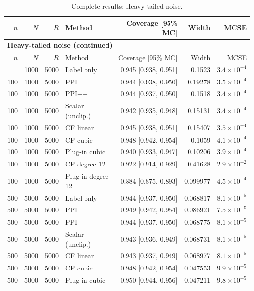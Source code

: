 {\setlength{\tabcolsep}{3pt}\begin{longtable}{rrrlrrr}
\caption{Complete results: Heavy-tailed noise.}\\
\toprule $n$ & $N$ & $R$ & Method & Coverage [95\% MC] & Width & MCSE \\
\midrule\endfirsthead
\multicolumn{7}{l}{\textbf{Heavy-tailed noise (continued)}}\\
\toprule $n$ & $N$ & $R$ & Method & Coverage [95\% MC] & Width & MCSE \\
\midrule\endhead
\bottomrule\endfoot
100 & 1000 & 5000 & Label only & 0.945 [0.938, 0.951] & 0.1523 & $3.4\times 10^{-4}$ \\
100 & 1000 & 5000 & PPI & 0.944 [0.938, 0.950] & 0.19278 & $3.5\times 10^{-4}$ \\
100 & 1000 & 5000 & PPI++ & 0.944 [0.937, 0.950] & 0.1518 & $3.4\times 10^{-4}$ \\
100 & 1000 & 5000 & Scalar (unclip.) & 0.942 [0.935, 0.948] & 0.15131 & $3.4\times 10^{-4}$ \\
100 & 1000 & 5000 & CF linear & 0.945 [0.938, 0.951] & 0.15407 & $3.5\times 10^{-4}$ \\
100 & 1000 & 5000 & CF cubic & 0.948 [0.942, 0.954] & 0.1059 & $4.1\times 10^{-4}$ \\
100 & 1000 & 5000 & Plug-in cubic & 0.940 [0.933, 0.947] & 0.10206 & $3.9\times 10^{-4}$ \\
100 & 1000 & 5000 & CF degree 12 & 0.922 [0.914, 0.929] & 0.41628 & $2.9\times 10^{-2}$ \\
100 & 1000 & 5000 & Plug-in degree 12 & 0.884 [0.875, 0.893] & 0.099977 & $4.5\times 10^{-4}$ \\
500 & 5000 & 5000 & Label only & 0.944 [0.937, 0.950] & 0.068817 & $8.1\times 10^{-5}$ \\
500 & 5000 & 5000 & PPI & 0.949 [0.942, 0.954] & 0.086921 & $7.5\times 10^{-5}$ \\
500 & 5000 & 5000 & PPI++ & 0.944 [0.937, 0.950] & 0.068775 & $8.1\times 10^{-5}$ \\
500 & 5000 & 5000 & Scalar (unclip.) & 0.943 [0.936, 0.949] & 0.068731 & $8.1\times 10^{-5}$ \\
500 & 5000 & 5000 & CF linear & 0.943 [0.937, 0.949] & 0.068977 & $8.1\times 10^{-5}$ \\
500 & 5000 & 5000 & CF cubic & 0.948 [0.942, 0.954] & 0.047553 & $9.9\times 10^{-5}$ \\
500 & 5000 & 5000 & Plug-in cubic & 0.950 [0.944, 0.956] & 0.047211 & $9.8\times 10^{-5}$ \\

\end{longtable}}
